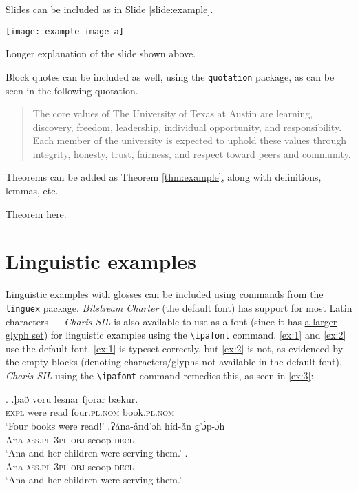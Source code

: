 Slides can be included as in Slide \ref{slide:example}.
\begin{slide}[H]
    \centering
    \texttt{[image: example-image-a]}
    \caption[Short example slide title]{Longer explanation of the slide shown above.}
    \label{slide:example}
\end{slide}

Block quotes can be included as well, using the \texttt{quotation} package, as can be seen in the following quotation.
\begin{quotation}
The core values of The University of Texas at Austin are learning, discovery, freedom, leadership, individual opportunity, and responsibility. Each member of the university is expected to uphold these values through integrity, honesty, trust, fairness, and respect toward peers and community.
\end{quotation}

Theorems can be added as Theorem \ref{thm:example}, along with definitions, lemmas, etc.
\begin{thm}
\label{thm:example}
Theorem here.
\end{thm}

\section{Linguistic examples}

Linguistic examples with glosses can be included using commands from the \texttt{linguex} package. \emph{Bitstream Charter} (the default font) has support for most Latin characters --- \emph{Charis SIL} is also available to use as a font (since it has \href{https://software.sil.org/charis/charset/}{a larger glyph set}) for linguistic examples using the \texttt{\textbackslash{}ipafont} command. \ref{ex:1} and \ref{ex:2} use the default font. \ref{ex:1} is typeset correctly, but \ref{ex:2} is not, as evidenced by the empty blocks (denoting characters/glyphs not available in the default font). \emph{Charis SIL} using the \texttt{\textbackslash{}ipafont} command remedies this, as seen in \ref{ex:3}:

\ex. \ag.\label{ex:1}það voru lesnar fjorar bækur.\\
          \textsc{expl} were read four.\textsc{pl.nom} book.\textsc{pl.nom}\\
          `Four books were read!'
     \bg.\label{ex:2}Ɂána-ǎnd’ǝh 	híd-ǎn 		g’ɔ́p-ɔ́h\\
         Ana-\textsc{ass.pl} \textsc{3pl-obj} scoop-\textsc{decl}\\
          `Ana and her children were serving them.'
     \bg.\label{ex:3}  \\
          Ana-\textsc{ass.pl} \textsc{3pl-obj} scoop-\textsc{decl}\\
          `Ana and her children were serving them.'

